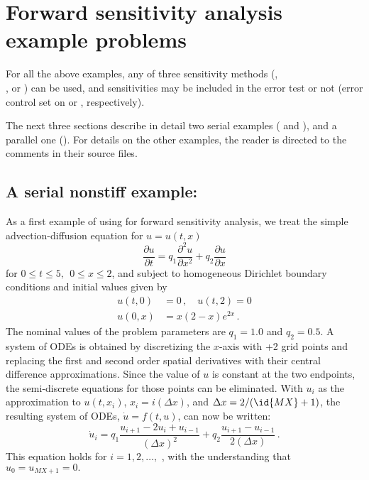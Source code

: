 \section{Forward sensitivity analysis example problems}\label{s:fwd_ex}

For all the above examples, any of three sensitivity methods (, \\
, or ) can be used, and sensitivities may be 
included in the error test or not (error control set on  or ,
respectively).

The next three sections describe in detail two serial examples ( and
), and a parallel one (). For details on the other examples,
the reader is directed to the comments in their source files.

\subsection{A serial nonstiff example: }
\label{ss:cvfnx}

As a first example of using {\cvodes} for forward sensitivity analysis,
we treat the simple advection-diffusion equation
for $u=u(t,x)$
\begin{equation}\label{e:cvfnx_PDE}
  \frac{\partial u}{\partial t}= q_1 \frac{\partial ^{2}u}{\partial x^{2}}
  + q_2 \frac{\partial u}{\partial x}
\end{equation}
for $0 \leq t \leq 5, ~~ 0\leq x \leq 2$, and subject to homogeneous
Dirichlet boundary conditions and initial values given by 
\begin{equation}\label{e:cvfnx_BC_IC}
  \begin{split}
    u(t,0) &= 0 \, , \quad u(t,2) = 0 \\
    u(0,x) &= x(2-x)e^{2x} \, .
  \end{split}
\end{equation}
The nominal values of the problem parameters are $q_1 = 1.0$ and $q_2 = 0.5$.
A system of  ODEs is obtained by discretizing the $x$-axis with +2
grid points and replacing the first and second order spatial derivatives
with their central difference approximations. Since the value of $u$ is
constant at the two endpoints, the semi-discrete equations for those points
can be eliminated.  With $u_{i}$ as the approximation to $u(t,x_{i})$, 
$x_{i} = i(\Delta x)$, and $\Delta x=2/(\id{MX}+1)$, the resulting system of
ODEs, ${\dot u} = f(t,u)$, can now be written:
\begin{equation}\label{e:cvfnx_ODE}
  {\dot u}_i= q_1 \frac{u_{i+1}-2u_{i}+u_{i-1}}{(\Delta x)^{2}}
  + q_2 \frac{u_{i+1}-u_{i-1}}{2(\Delta x)} \, .
\end{equation}
This equation holds for $i=1,2,\ldots ,$ , with the understanding
that $u_{0} = u_{MX+1}=0.$

